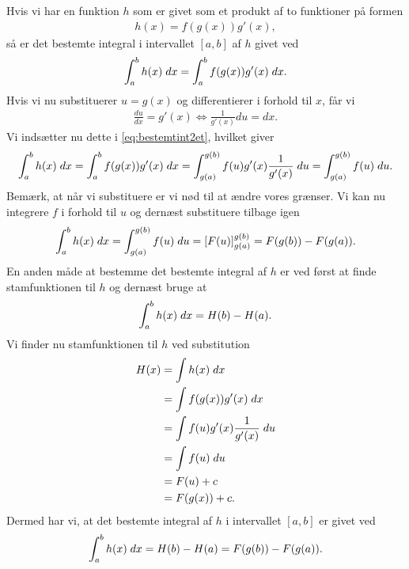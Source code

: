 Hvis vi har en funktion $h$ som er givet som et produkt af to funktioner på formen
\begin{align*}
h(x) = f(g(x))g'(x),
\end{align*}
så er det bestemte integral i intervallet $[a,b]$ af $h$ givet ved
\begin{align}\label{eq:bestemtint2et}
\int_a^b h(x) \; d x = \int_a^b f(g(x))g'(x) \; d x.
\end{align}
Hvis vi nu substituerer $u=g(x)$ og differentierer i forhold til $x$, får vi
\begin{align*}
\frac{du}{dx}=g'(x) \Leftrightarrow \frac{1}{g'(x)} du = dx.
\end{align*}
Vi indsætter nu dette i \eqref{eq:bestemtint2et}, hvilket giver
\begin{align*}
\int_a^b h(x) \; d x = \int_a^b f(g(x))g'(x) \; d x = \int_{g(a)}^{g(b)} f(u) g'(x) \frac{1}{g'(x)}\; d u = \int_{g(a)}^{g(b)} f(u) \; d u.
\end{align*}
Bemærk, at når vi substituere er vi nød til at ændre vores grænser.
Vi kan nu integrere $f$ i forhold til $u$ og dernæst substituere tilbage igen
\begin{align*}
\int_a^b h(x) \; d x = \int_{g(a)}^{g(b)} f(u) \; d u = [F(u)]^{g(b)}_{g(a)} = F(g(b))-F(g(a)).
\end{align*}
En anden måde at bestemme det bestemte integral af $h$ er ved først at finde stamfunktionen til $h$ og dernæst bruge at
\begin{align*}
\int_a^b h(x) \; d x = H(b) - H(a).
\end{align*}
Vi finder nu stamfunktionen til $h$ ved substitution
\begin{align*}
H(x) &= \int h(x) \; d x \\
&= \int f(g(x))g'(x) \; d x \\
&= \int f(u) g'(x) \frac{1}{g'(x)} \; d u \\
&= \int f(u) \; d u \\
&= F(u) +c \\
&= F(g(x))+c. 
\end{align*}
Dermed har vi, at det bestemte integral af $h$ i intervallet $[a,b]$ er givet ved
\begin{align*}
\int_a^b h(x) \; d x = H(b)-H(a) = F(g(b))-F(g(a)).
\end{align*}

